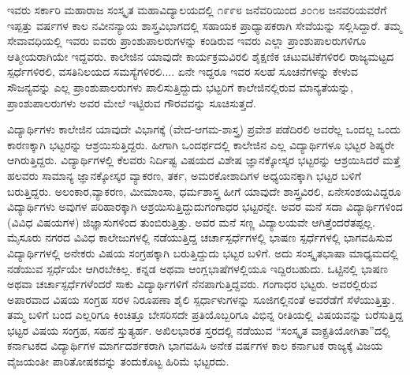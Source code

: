 {ಇವರು ಸರ್ಕಾರಿ ಮಹಾರಾಜ ಸಂಸ್ಕೃತ ಮಹಾವಿದ್ಯಾಲಯದಲ್ಲಿ ೧೯೯೮ ಜನೆವರಿಯಿಂದ ೨೦೧೮ ಜನವರಿಯವರೆಗೆ ಇಪ್ಪತ್ತು ವರ್ಷಗಳ ಕಾಲ ನವೀನನ್ಯಾಯ ಶಾಸ್ತ್ರವಿಭಾಗದಲ್ಲಿ ಸಹಾಯಕ ಪ್ರಾಧ್ಯಾಪಕರಾಗಿ ಸೇವೆಯನ್ನು ಸಲ್ಲಿಸಿದ್ದಾರೆ. ತಮ್ಮ ಸೇವಾವಧಿಯಲ್ಲಿ ಇವರು ಐವರು ಪ್ರಾಂಶುಪಾಲರುಗಳನ್ನು ಕಂಡಿರುವ ಇವರು ಎಲ್ಲಾ ಪ್ರಾಂಶುಪಾಲರುಗಳಿಗೂ ಆತ್ಮೀಯರಾಗಿಯೇ ಇದ್ದವರು. ಕಾಲೇಜಿನ ಯಾವುದೇ ಕಾರ್ಯಕ್ರಮವಿರಲಿ ಶೈಕ್ಷಣಿಕ ಚಟುವಟಿಕೆಗಳಿರಲಿ ರಾಜ್ಯಮಟ್ಟದ ಸ್ಪರ್ಧೆಗಳಿರಲಿ, ವಸತಿನಿಲಯದ ಸಮಸ್ಯೆಗಳಿರಲಿ.... ಏನೇ ಇದ್ದರೂ ಇವರ ಸಲಹೆ ಸೂಚನೆಗಳನ್ನು ಕೇಳುವ ಸೌಜನ್ಯವನ್ನು ಎಲ್ಲ ಪ್ರಾಂಶುಪಾಲರುಗಳು ಪಾಲಿಸುತ್ತಿದ್ದುದು ಭಟ್ಟರಿಗೆ ಕಾಲೇಜಿನಲ್ಲಿರುವ ಮಾನ್ಯತೆಯನ್ನು, ಪ್ರಾಂಶುಪಾಲರುಗಳು ಅವರ ಮೇಲೆ ಇಟ್ಟಿರುವ ಗೌರವವನ್ನು ಸೂಚಿಸುತ್ತದೆ. 

ವಿದ್ಯಾರ್ಥಿಗಳು ಕಾಲೇಜಿನ ಯಾವುದೇ ವಿಭಾಗಕ್ಕೆ (ವೇದ-ಆಗಮ-ಶಾಸ್ತ್ರ) ಪ್ರವೇಶ ಪಡೆದಿರಲಿ ಅವರೆಲ್ಲ ಒಂದಲ್ಲ ಒಂದು ಕಾರಣಕ್ಕಾಗಿ ಭಟ್ಟರನ್ನು ಆಶ್ರಯಿಸುತ್ತಿದ್ದರು. ಹೀಗಾಗಿ ಒಂದರ್ಥದಲ್ಲಿ ಕಾಲೇಜಿನ ಎಲ್ಲ ವಿದ್ಯಾರ್ಥಿಗಳೂ ಭಟ್ಟರ ಶಿಷ್ಯರೇ ಆಗಿರುತ್ತಿದ್ದರು. ವಿದ್ಯಾರ್ಥಿಗಳಲ್ಲಿ ಕೆಲವರು ನಿರ್ದಿಷ್ಟ ವಿಷಯದ ವಿಶೇಷ ಜ್ಞಾನಕ್ಕೋಸ್ಕರ ಭಟ್ಟರನ್ನು ಆಶ್ರಯಿಸಿದರೆ ಮತ್ತೆ ಹಲವರು ಸಾಮಾನ್ಯ ಜ್ಞಾನಕ್ಕೋಸ್ಕರ ವ್ಯಾಕರಣ, ತರ್ಕ, ಅಮರಕೋಶಾದಿಗಳ ಅಧ್ಯಯನಕ್ಕಾಗಿ ಭಟ್ಟರ ಬಳಿಗೆ ಬರುತ್ತಿದ್ದರು. ಅಲಂಕಾರ,\break ವ್ಯಾಕರಣ, ಮೀಮಾಂಸಾ, ಧರ್ಮಶಾಸ್ತ್ರ ಹೀಗೆ ಯಾವುದೇ ಶಾಸ್ತ್ರವಿರಲಿ, ಏನೇ\break ಸಂಶಯವಿದ್ದರೂ ವಿದ್ಯಾರ್ಥಿಗಳು ಅವುಗಳ ಪರಿಹಾರಕ್ಕಾಗಿ ಆಶ್ರಯಿಸುತ್ತಿದ್ದುದು\break ಗಂಗಾಧರ ಭಟ್ಟರನ್ನೇ. ಅವರ ಮನೆ ಸದಾ ವಿದ್ಯಾರ್ಥಿಗಳಿಂದ (ವಿವಿಧ ವಿಷಯಗಳ) ಜಿಜ್ಞಾಸುಗಳಿಂದ ತುಂಬಿರುತ್ತಿತ್ತು. ಅವರ ಮನೆ ಸಣ್ಣ ವಿದ್ಯಾಲಯವೇ ಆಗಿತ್ತೆಂದರೆ\break ತಪ್ಪಲ್ಲ. ಮೈಸೂರು ನಗರದ ವಿವಿಧ ಕಾಲೇಜುಗಳಲ್ಲಿ ನಡೆಯುತ್ತಿದ್ದ ಚರ್ಚಾಸ್ಪರ್ಧೆಗಳಲ್ಲಿ ಭಾಷಣ ಸ್ಪರ್ಧೆಗಳಲ್ಲಿ ಭಾಗವಹಿಸುವ ವಿದ್ಯಾರ್ಥಿಗಳಲ್ಲಿ ಅನೇಕರು ವಿಷಯ ಸಂಗ್ರಹಕ್ಕಾಗಿ ಬರುತ್ತಿದ್ದುದು ಭಟ್ಟರ ಬಳಿಗೆ. ಅದು ಸಂಸ್ಕೃತಭಾಷಾ ಮಾಧ್ಯಮದಲ್ಲಿ ನಡೆಯುವ ಸ್ಪರ್ಧೆಯೇ ಆಗಿರಬೇಕಿಲ್ಲ. ಕನ್ನಡ ಅಥವಾ ಆಂಗ್ಲಭಾಷೆಗಳಲ್ಲಿಯೂ ಇದ್ದಿರಬಹುದು. ಒಟ್ಟಿನಲ್ಲಿ ಭಾಷಣ ಅಥವಾ ಚರ್ಚಾಸ್ಪರ್ಧೆಗಳೆಂದರೆ ಸಾಕು ವಿದ್ಯಾರ್ಥಿಗಳಿಗೆ ನೆನಪಾಗುತ್ತಿದ್ದವರು. ಗಂಗಾಧರ ಭಟ್ಟರು. ಅವರಲ್ಲಿರುವ ಅಪಾರವಾದ ವಿಷಯ ಸಂಗ್ರಹ ಸರಳ ನಿರೂಪಣಾ ಶೈಲಿ ಸ್ಪರ್ಧಾಳುಗಳನ್ನು ಸೂಜಿಗಲ್ಲಿನಂತೆ ಅವರೆಡೆಗೆ ಸೆಳೆಯುತ್ತಿತ್ತು. ತಮ್ಮ ಬಳಿಗೆ ಬಂದ ಎಲ್ಲರಿಗೂ ಕಿಂಚಿತ್ತೂ ಬೇಸರಿಸದೇ ಪ್ರತಿಯೊಬ್ಬರಿಗೂ ವಿಭಿನ್ನ ರೀತಿಯಲ್ಲಿ ವಿಷಯವನ್ನು ಬರೆಸುತ್ತಿದ್ದ ಭಟ್ಟರ ವಿಷಯ ಸಂಗ್ರಹ, ಸಹನೆ ಸ್ತುತ್ಯರ್ಹ. ಅಖಿಲಭಾರತ ಸ್ತರದಲ್ಲಿ ನಡೆಯುವ  “ಸಂಸ್ಕೃತ ವಾಕ್ಪ್ರತಿಯೋಗಿತಾ”ದಲ್ಲಿ ಕರ್ನಾಟಕದ ವಿದ್ಯಾರ್ಥಿಗಳ ಮಾರ್ಗದರ್ಶಕರಾಗಿ ಭಾಗವಹಿಸಿ ಅನೇಕ ವರ್ಷಗಳ ಕಾಲ ಕರ್ನಾಟಕ ರಾಜ್ಯಕ್ಕೆ ವಿಜಯ ವೈಜಯಂತೀ ಪಾರಿತೋಷಕವನ್ನು ತಂದುಕೊಟ್ಟ ಹಿರಿಮೆ ಭಟ್ಟರದು.

}

